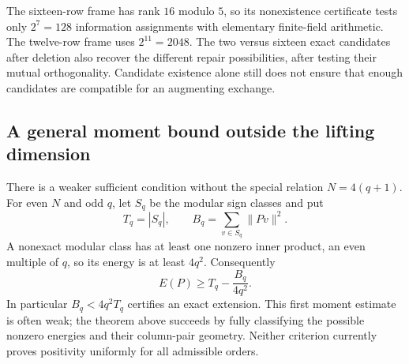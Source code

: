 The sixteen-row frame has rank $16$ modulo $5$, so its nonexistence
certificate tests only $2^7=128$ information assignments with elementary
finite-field arithmetic. The twelve-row frame uses $2^{11}=2048$.
The two versus sixteen exact candidates after deletion also recover
the different repair possibilities, after testing their mutual
orthogonality. Candidate existence alone still does not ensure that
enough candidates are compatible for an augmenting exchange.

\subsection{A general moment bound outside the lifting dimension}
There is a weaker sufficient condition without the special relation
$N=4(q+1)$. For even $N$ and odd $q$, let $S_q$ be the modular sign
classes and put
\[
 T_q=|S_q|,\qquad B_q=\sum_{v\in S_q}\|Pv\|^2.
\]
A nonexact modular class has at least one nonzero inner product, an
even multiple of $q$, so its energy is at least $4q^2$. Consequently
\[
 E(P)\ge T_q-\frac{B_q}{4q^2}.
\]
In particular $B_q<4q^2T_q$ certifies an exact extension. This first
moment estimate is often weak; the theorem above succeeds by fully
classifying the possible nonzero energies and their column-pair
geometry. Neither criterion currently proves positivity uniformly
for all admissible orders.
